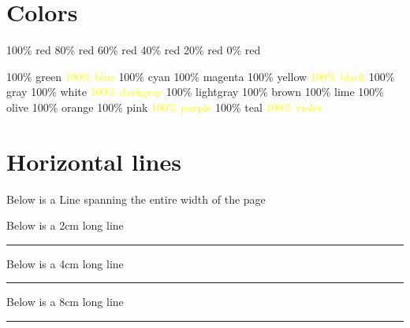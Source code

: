 \documentclass[12pt, letterpaper, oneside]{article}
\begin{document}
\section{Colors}

\colorbox{red!100}{100\% red}
\colorbox{red!80}{80\% red}
\colorbox{red!60}{60\% red}
\colorbox{red!40}{40\% red}
\colorbox{red!20}{20\% red}
\colorbox{red!0}{0\% red}

\colorbox{green!100}{100\% green}
\colorbox{blue!100}{\textcolor{yellow}{100\% blue}}
\colorbox{cyan!100}{100\% cyan}
\colorbox{magenta!100}{100\% magenta}
\colorbox{yellow!100}{100\% yellow}
\colorbox{black!100}{\textcolor{yellow}{100\% black}}
\colorbox{gray!100}{100\% gray}
\colorbox{white!100}{100\% white}
\colorbox{darkgray!100}{\textcolor{yellow}{100\% darkgray}}
\colorbox{lightgray!100}{100\% lightgray}
\colorbox{brown!100}{100\% brown}
\colorbox{lime!100}{100\% lime}
\colorbox{olive!100}{100\% olive}
\colorbox{orange!100}{100\% orange}
\colorbox{pink!100}{100\% pink}
\colorbox{purple!100}{\textcolor{yellow}{100\% purple}}
\colorbox{teal!100}{100\% teal}
\colorbox{violet!100}{\textcolor{yellow}{100\% violet}}

\section{Horizontal lines}

Below is a Line spanning the entire width of the page

\noindent\makebox[\linewidth]{\rule{\paperwidth}{0.4pt}}

Below is a 2cm long line

\noindent\rule{2cm}{0.4pt}

Below is a 4cm long line

\noindent\rule{4cm}{0.4pt}

Below is a 8cm long line

\noindent\rule{8cm}{0.4pt}
\end{document}

